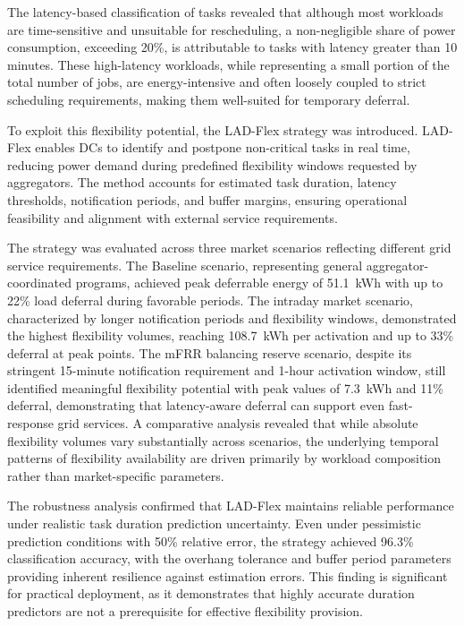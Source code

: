 \documentclass[preprint,12pt]{elsarticle}
\begin{document}
The latency-based classification of tasks revealed that although most workloads are time-sensitive and unsuitable for rescheduling, a non-negligible share of power consumption, exceeding 20\%, is attributable to tasks with latency greater than 10 minutes. These high-latency workloads, while representing a small portion of the total number of jobs, are energy-intensive and often loosely coupled to strict scheduling requirements, making them well-suited for temporary deferral.

To exploit this flexibility potential, the LAD-Flex strategy was introduced. LAD-Flex enables DCs to identify and postpone non-critical tasks in real time, reducing power demand during predefined flexibility windows requested by aggregators. The method accounts for estimated task duration, latency thresholds, notification periods, and buffer margins, ensuring operational feasibility and alignment with external service requirements.

The strategy was evaluated across three market scenarios reflecting different grid service requirements. The Baseline scenario, representing general aggregator-coordinated programs, achieved peak deferrable energy of 51.1~kWh with up to 22\% load deferral during favorable periods. The intraday market scenario, characterized by longer notification periods and flexibility windows, demonstrated the highest flexibility volumes, reaching 108.7~kWh per activation and up to 33\% deferral at peak points. The mFRR balancing reserve scenario, despite its stringent 15-minute notification requirement and 1-hour activation window, still identified meaningful flexibility potential with peak values of 7.3~kWh and 11\% deferral, demonstrating that latency-aware deferral can support even fast-response grid services. A comparative analysis revealed that while absolute flexibility volumes vary substantially across scenarios, the underlying temporal patterns of flexibility availability are driven primarily by workload composition rather than market-specific parameters.

The robustness analysis confirmed that LAD-Flex maintains reliable performance under realistic task duration prediction uncertainty. Even under pessimistic prediction conditions with 50\% relative error, the strategy achieved 96.3\% classification accuracy, with the overhang tolerance and buffer period parameters providing inherent resilience against estimation errors. This finding is significant for practical deployment, as it demonstrates that highly accurate duration predictors are not a prerequisite for effective flexibility provision.
\end{document}
